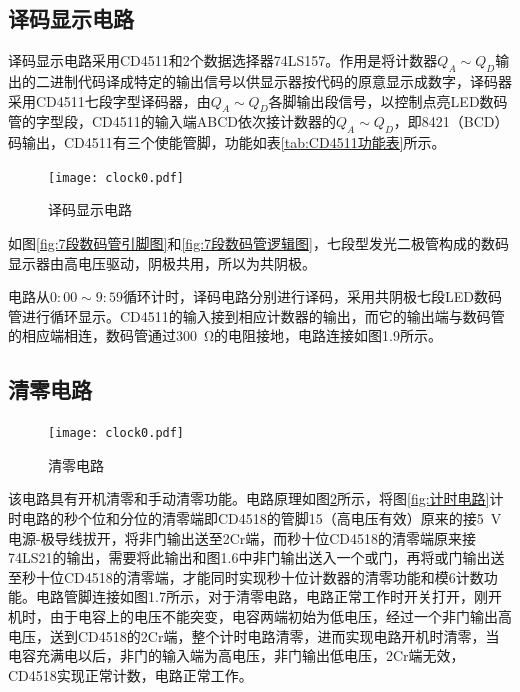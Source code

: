 \documentclass{article}
\newcounter{sub}
\begin{document}
\subsection{译码显示电路}%
\label{sub:译码显示电路}

译码显示电路采用CD4511和2个数据选择器74LS157。作用是将计数器$ Q_A\sim Q_D $输出的二进制代码译成特定的输出信号以供显示器按代码的原意显示成数字，译码器采用CD4511七段字型译码器，由$ Q_A\sim Q_D $各脚输出段信号，以控制点亮LED数码管的字型段，CD4511的输入端ABCD依次接计数器的$ Q_A\sim Q_D $，即8421（BCD）码输出，CD4511有三个使能管脚，功能如表\ref{tab:CD4511功能表}所示。

\begin{figure}[htpb]
	\centering
	\texttt{[image: clock0.pdf]}
	\caption{译码显示电路}
	\label{fig:译码显示电路}
\end{figure}

如图\ref{fig:7段数码管引脚图}和\ref{fig:7段数码管逻辑图}，七段型发光二极管构成的数码显示器由高电压驱动，阴极共用，所以为共阴极。

电路从$ 0:00\sim 9:59 $循环计时，译码电路分别进行译码，采用共阴极七段LED数码管进行循环显示。CD4511的输入接到相应计数器的输出，而它的输出端与数码管的相应端相连，数码管通过\SI{300}{\ohm}的电阻接地，电路连接如图1.9所示。

\subsection{清零电路}%
\label{sub:清零电路}

\begin{figure}
	\vspace{-10pt}
	\centering
	\texttt{[image: clock0.pdf]}
	\caption{清零电路}
	\label{fig:清零电路}
	\vspace{-10pt}
\end{figure}

该电路具有开机清零和手动清零功能。电路原理如图\ref{fig:清零电路}所示，将图\ref{fig:计时电路}计时电路的秒个位和分位的清零端即CD4518的管脚15（高电压有效）原来的接\SI{5}{V}电源-极导线拔开，将非门输出送至2Cr端，而秒十位CD4518的清零端原来接74LS21的输出，需要将此输出和图1.6中非门输出送入一个或门，再将或门输出送至秒十位CD4518的清零端，才能同时实现秒十位计数器的清零功能和模6计数功能。电路管脚连接如图1.7所示，对于清零电路，电路正常工作时开关打开，刚开机时，由于电容上的电压不能突变，电容两端初始为低电压，经过一个非门输出高电压，送到CD4518的2Cr端，整个计时电路清零，进而实现电路开机时清零，当电容充满电以后，非门的输入端为高电压，非门输出低电压，2Cr端无效，CD4518实现正常计数，电路正常工作。
\end{document}
